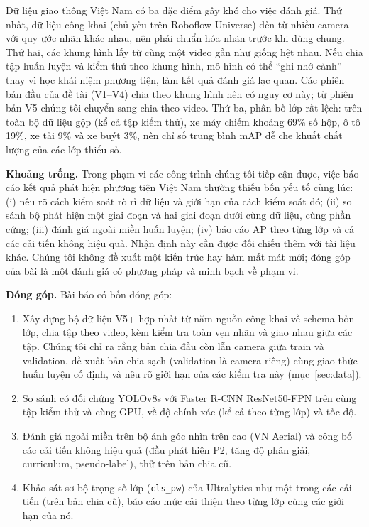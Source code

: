 \documentclass[10pt,journal,letterpaper]{IEEEtran}
\begin{document}
Dữ liệu giao thông Việt Nam có ba đặc điểm gây khó cho việc đánh giá. Thứ nhất, dữ liệu công khai (chủ yếu trên Roboflow Universe) đến từ nhiều camera với quy ước nhãn khác nhau, nên phải chuẩn hóa nhãn trước khi dùng chung. Thứ hai, các khung hình lấy từ cùng một video gần như giống hệt nhau. Nếu chia tập huấn luyện và kiểm thử theo khung hình, mô hình có thể ``ghi nhớ cảnh'' thay vì học khái niệm phương tiện, làm kết quả đánh giá lạc quan. Các phiên bản đầu của đề tài (V1--V4) chia theo khung hình nên có nguy cơ này; từ phiên bản V5 chúng tôi chuyển sang chia theo video. Thứ ba, phân bố lớp rất lệch: trên toàn bộ dữ liệu gộp (kể cả tập kiểm thử), xe máy chiếm khoảng 69\% số hộp, ô tô 19\%, xe tải 9\% và xe buýt 3\%, nên chỉ số trung bình mAP dễ che khuất chất lượng của các lớp thiểu số.

\textbf{Khoảng trống.} Trong phạm vi các công trình chúng tôi tiếp cận được, việc báo cáo kết quả phát hiện phương tiện Việt Nam thường thiếu bốn yếu tố cùng lúc: (i) nêu rõ cách kiểm soát rò rỉ dữ liệu và giới hạn của cách kiểm soát đó; (ii) so sánh bộ phát hiện một giai đoạn và hai giai đoạn dưới cùng dữ liệu, cùng phần cứng; (iii) đánh giá ngoài miền huấn luyện; (iv) báo cáo AP theo từng lớp và cả các cải tiến không hiệu quả. Nhận định này cần được đối chiếu thêm với tài liệu khác. Chúng tôi không đề xuất một kiến trúc hay hàm mất mát mới; đóng góp của bài là một đánh giá có phương pháp và minh bạch về phạm vi.

\textbf{Đóng góp.} Bài báo có bốn đóng góp:
\begin{enumerate}
\item Xây dựng bộ dữ liệu V5+ hợp nhất từ năm nguồn công khai về schema bốn lớp, chia tập theo video, kèm kiểm tra toàn vẹn nhãn và giao nhau giữa các tập. Chúng tôi chỉ ra rằng bản chia đầu còn lẫn camera giữa train và validation, đề xuất bản chia sạch (validation là camera riêng) cùng giao thức huấn luyện cố định, và nêu rõ giới hạn của các kiểm tra này (mục~\ref{sec:data}).
\item So sánh có đối chứng YOLOv8s với Faster R-CNN ResNet50-FPN trên cùng tập kiểm thử và cùng GPU, về độ chính xác (kể cả theo từng lớp) và tốc độ.
\item Đánh giá ngoài miền trên bộ ảnh góc nhìn trên cao (VN Aerial) và công bố các cải tiến không hiệu quả (đầu phát hiện P2, tăng độ phân giải, curriculum, pseudo-label), thử trên bản chia cũ.
\item Khảo sát sơ bộ trọng số lớp (\texttt{cls\_pw}) của Ultralytics như một trong các cải tiến (trên bản chia cũ), báo cáo mức cải thiện theo từng lớp cùng các giới hạn của nó.
\end{enumerate}
\end{document}
